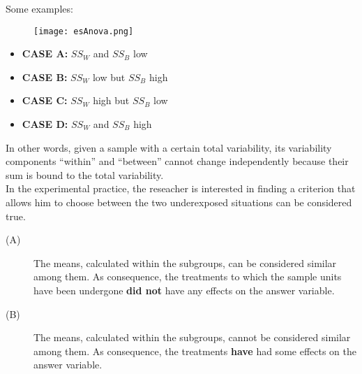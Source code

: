 \begin{frame} 
  \vspace{-.2cm}
  Some examples:
  \vspace{-.3cm}
  \begin{figure}
    \texttt{[image: esAnova.png]}
  \end{figure}
  \begin{footnotesize}
    \begin{itemize}
      \item \textbf{CASE A:} {\boldmath$ SS_W $} and {\boldmath$ SS_B $} low 
      \item \textbf{CASE B:} {\boldmath$ SS_W $} low but {\boldmath$ SS_B $} high
      \item \textbf{CASE C:} {\boldmath$ SS_W $} high but  {\boldmath$ SS_B $} low
      \item \textbf{CASE D:} {\boldmath$ SS_W $} and  {\boldmath$ SS_B $} high
    \end{itemize}
  \end{footnotesize}
\end{frame}

\begin{frame}
  \begin{small}
    \vspace*{.25cm}
    In other words, given a sample with a certain total variability, its variability components  ``within'' and ``between'' cannot change independently because their sum is bound to the total variability.\\
    \vspace*{.25cm}
    In the experimental practice, the reseacher is interested in finding a criterion that allows him to choose between the two underexposed situations can be considered true. 
    \vspace*{.25cm}
    \begin{description}
      \item[(A)]The means, calculated within the subgroups, can be considered similar among them. As consequence, the treatments to which the sample units have been undergone \textbf{did not} have any effects on the answer variable.
      \vspace*{.25cm}
      \item[(B)]The means, calculated within the subgroups, cannot be considered similar among them. As consequence, the treatments \textbf{have} had some effects on the answer variable.
    \end{description}
  \end{small}
\end{frame}

